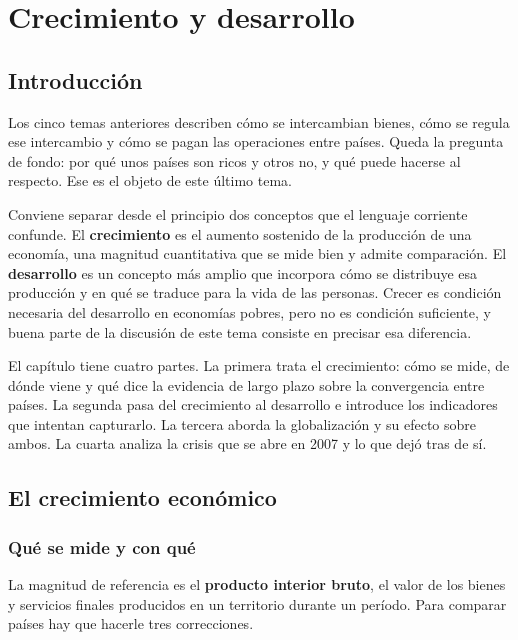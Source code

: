 \chapter{Crecimiento y desarrollo}

\section{Introducción}

Los cinco temas anteriores describen cómo se intercambian bienes, cómo se
regula ese intercambio y cómo se pagan las operaciones entre países. Queda la
pregunta de fondo: por qué unos países son ricos y otros no, y qué puede
hacerse al respecto. Ese es el objeto de este último tema.

Conviene separar desde el principio dos conceptos que el lenguaje corriente
confunde. El \textbf{crecimiento} es el aumento sostenido de la producción de
una economía, una magnitud cuantitativa que se mide bien y admite comparación.
El \textbf{desarrollo} es un concepto más amplio que incorpora cómo se
distribuye esa producción y en qué se traduce para la vida de las personas.
Crecer es condición necesaria del desarrollo en economías pobres, pero no es
condición suficiente, y buena parte de la discusión de este tema consiste en
precisar esa diferencia.

El capítulo tiene cuatro partes. La primera trata el crecimiento: cómo se mide,
de dónde viene y qué dice la evidencia de largo plazo sobre la convergencia
entre países. La segunda pasa del crecimiento al desarrollo e introduce los
indicadores que intentan capturarlo. La tercera aborda la globalización y su
efecto sobre ambos. La cuarta analiza la crisis que se abre en 2007 y lo que
dejó tras de sí.

\section{El crecimiento económico}

\subsection{Qué se mide y con qué}

La magnitud de referencia es el \textbf{producto interior bruto}, el valor de
los bienes y servicios finales producidos en un territorio durante un período.
Para comparar países hay que hacerle tres correcciones.

